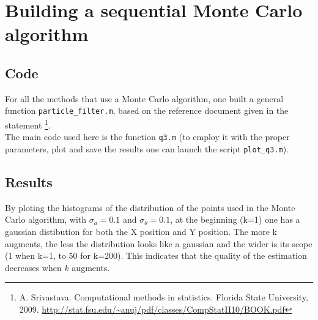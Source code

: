 \documentclass[english,DIV=13]{scrreprt}
\begin{document}
\chapter{Building a sequential Monte Carlo algorithm}
\section*{Code}
For all the methods that use a Monte Carlo algorithm, one built a general function 
\texttt{particle\_filter.m}, based on the reference document given in the statement
\footnote{A. Srivastava. Computational methods in statistics. Florida State University, 2009.
\url{http://stat.fsu.edu/~anuj/pdf/classes/CompStatII10/BOOK.pdf}}.\\

The main code used here is the function \texttt{q3.m} (to employ it with the proper
parameters, plot and save the results one can launch the script \texttt{plot\_q3.m}).
\newpage

\section*{Results}
By ploting the histograms of the distribution of the points used in the Monte Carlo algorithm, 
with $\sigma_a=0.1$ and $\sigma_{\theta}=0.1$, at the beginning (k=1) one has a gaussian
distibution for both the X position and Y position. The more k augments, the less the
distribution looks like a gaussian and the wider is its scope (1 when k=1, to 50 for k=200).
This indicates that the quality of the estimation decreases when $k$ augments.
\end{document}
